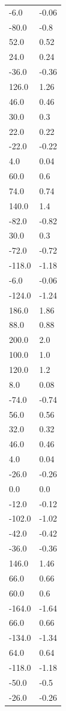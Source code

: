 \begin{longtable}{ll}
-6.0 & -0.06 \\
-80.0 & -0.8 \\
52.0 & 0.52 \\
24.0 & 0.24 \\
-36.0 & -0.36 \\
126.0 & 1.26 \\
46.0 & 0.46 \\
30.0 & 0.3 \\
22.0 & 0.22 \\
-22.0 & -0.22 \\
4.0 & 0.04 \\
60.0 & 0.6 \\
74.0 & 0.74 \\
140.0 & 1.4 \\
-82.0 & -0.82 \\
30.0 & 0.3 \\
-72.0 & -0.72 \\
-118.0 & -1.18 \\
-6.0 & -0.06 \\
-124.0 & -1.24 \\
186.0 & 1.86 \\
88.0 & 0.88 \\
200.0 & 2.0 \\
100.0 & 1.0 \\
120.0 & 1.2 \\
8.0 & 0.08 \\
-74.0 & -0.74 \\
56.0 & 0.56 \\
32.0 & 0.32 \\
46.0 & 0.46 \\
4.0 & 0.04 \\
-26.0 & -0.26 \\
0.0 & 0.0 \\
-12.0 & -0.12 \\
-102.0 & -1.02 \\
-42.0 & -0.42 \\
-36.0 & -0.36 \\
146.0 & 1.46 \\
66.0 & 0.66 \\
60.0 & 0.6 \\
-164.0 & -1.64 \\
66.0 & 0.66 \\
-134.0 & -1.34 \\
64.0 & 0.64 \\
-118.0 & -1.18 \\
-50.0 & -0.5 \\
-26.0 & -0.26 \\

\end{longtable}
